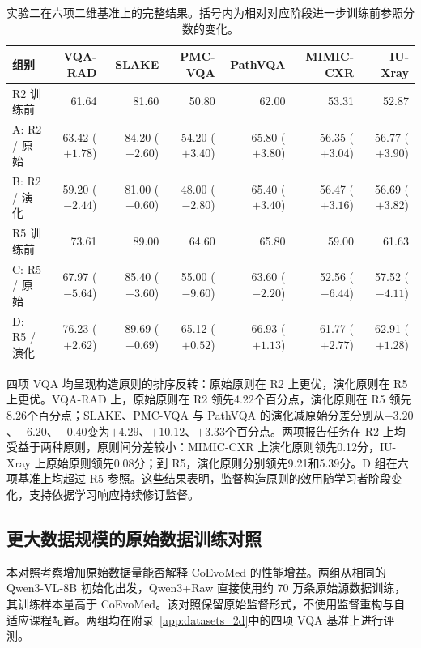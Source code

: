 \begin{table}[H]
\centering\scriptsize
\caption{实验二在六项二维基准上的完整结果。括号内为相对对应阶段进一步训练前参照分数的变化。}
\label{tab:stage_full}
\setlength{\tabcolsep}{3pt}
\renewcommand{\arraystretch}{1.18}
\begin{tabularx}{\linewidth}{@{}Yrrrrrr@{}}
\toprule
组别 & VQA-RAD & SLAKE & PMC-VQA & PathVQA & MIMIC-CXR & IU-Xray\\
\midrule
R2 训练前 & 61.64 & 81.60 & 50.80 & 62.00 & 53.31 & 52.87\\
A: R2 / 原始 & 63.42 ($+1.78$) & 84.20 ($+2.60$) & 54.20 ($+3.40$) & 65.80 ($+3.80$) & 56.35 ($+3.04$) & 56.77 ($+3.90$)\\
B: R2 / 演化 & 59.20 ($-2.44$) & 81.00 ($-0.60$) & 48.00 ($-2.80$) & 65.40 ($+3.40$) & 56.47 ($+3.16$) & 56.69 ($+3.82$)\\
\midrule
R5 训练前 & 73.61 & 89.00 & 64.60 & 65.80 & 59.00 & 61.63\\
C: R5 / 原始 & 67.97 ($-5.64$) & 85.40 ($-3.60$) & 55.00 ($-9.60$) & 63.60 ($-2.20$) & 52.56 ($-6.44$) & 57.52 ($-4.11$)\\
 D: R5 / 演化 & 76.23 ($+2.62$) & 89.69 ($+0.69$) & 65.12 ($+0.52$) & 66.93 ($+1.13$) & 61.77 ($+2.77$) & 62.91 ($+1.28$)\\
\bottomrule
\end{tabularx}
\end{table}

四项 VQA 均呈现构造原则的排序反转：原始原则在 R2 上更优，演化原则在 R5 上更优。VQA-RAD 上，原始原则在 R2 领先4.22个百分点，演化原则在 R5 领先8.26个百分点；SLAKE、PMC-VQA 与 PathVQA 的演化减原始分差分别从$-3.20$、$-6.20$、$-0.40$变为$+4.29$、$+10.12$、$+3.33$个百分点。两项报告任务在 R2 上均受益于两种原则，原则间分差较小：MIMIC-CXR 上演化原则领先0.12分，IU-Xray 上原始原则领先0.08分；到 R5，演化原则分别领先9.21和5.39分。D 组在六项基准上均超过 R5 参照。这些结果表明，监督构造原则的效用随学习者阶段变化，支持依据学习响应持续修订监督。

\subsection{更大数据规模的原始数据训练对照}
\label{app:raw_source}

本对照考察增加原始数据量能否解释 CoEvoMed 的性能增益。两组从相同的 Qwen3-VL-8B 初始化出发，Qwen3+Raw 直接使用约 70 万条原始源数据训练，其训练样本量高于 CoEvoMed。该对照保留原始监督形式，不使用监督重构与自适应课程配置。两组均在附录~\ref{app:datasets_2d}中的四项 VQA 基准上进行评测。

